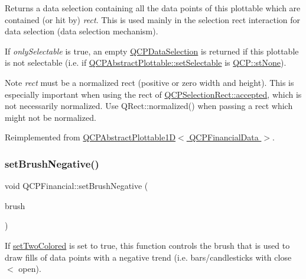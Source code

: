 Returns a data selection containing all the data points of this plottable which are contained (or hit by) {\itshape rect}. This is used mainly in the selection rect interaction for data selection (data selection mechanism).

If {\itshape only\+Selectable} is true, an empty \hyperlink{class_q_c_p_data_selection}{Q\+C\+P\+Data\+Selection} is returned if this plottable is not selectable (i.\+e. if \hyperlink{class_q_c_p_abstract_plottable_ac238d6e910f976f1f30d41c2bca44ac3}{Q\+C\+P\+Abstract\+Plottable\+::set\+Selectable} is \hyperlink{namespace_q_c_p_ac6cb9db26a564b27feda362a438db038aa64628e338a2dd1e6f0dc84dec0b63fe}{Q\+C\+P\+::st\+None}).

\begin{DoxyNote}{Note}
{\itshape rect} must be a normalized rect (positive or zero width and height). This is especially important when using the rect of \hyperlink{class_q_c_p_selection_rect_a15a43542e1f7b953a44c260b419e6d2c}{Q\+C\+P\+Selection\+Rect\+::accepted}, which is not necessarily normalized. Use {\ttfamily Q\+Rect\+::normalized()} when passing a rect which might not be normalized. 
\end{DoxyNote}


Reimplemented from \hyperlink{class_q_c_p_abstract_plottable1_d_ac385c38a79e419ed3600c2ee398fd216}{Q\+C\+P\+Abstract\+Plottable1\+D$<$ Q\+C\+P\+Financial\+Data $>$}.

\mbox{\label{class_q_c_p_financial_a8bbdd87629f9144b3ef51af660c0961a}} 
\subsubsection{\texorpdfstring{set\+Brush\+Negative()}{setBrushNegative()}}
{\footnotesize\ttfamily void Q\+C\+P\+Financial\+::set\+Brush\+Negative (\begin{DoxyParamCaption}\item[{const Q\+Brush \&}]{brush }\end{DoxyParamCaption})}

If \hyperlink{class_q_c_p_financial_a138e44aac160a17a9676652e240c5f08}{set\+Two\+Colored} is set to true, this function controls the brush that is used to draw fills of data points with a negative trend (i.\+e. bars/candlesticks with close $<$ open).

